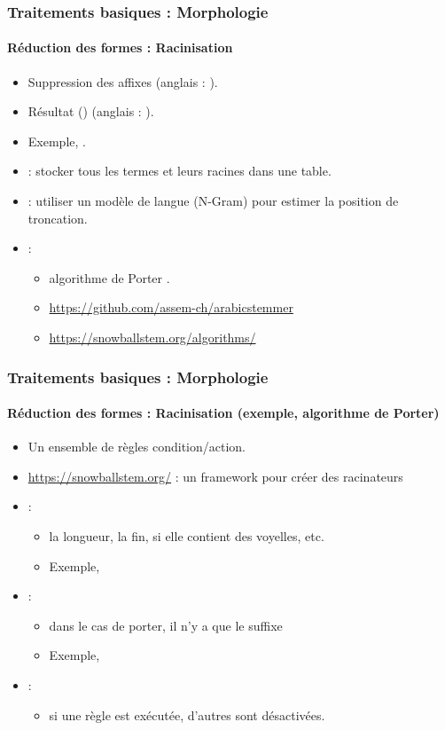 \documentclass[xcolor=table]{beamer}
\begin{document}
\begin{frame}
\frametitle{Traitements basiques : Morphologie}
\framesubtitle{Réduction des formes : Racinisation}

\begin{itemize}
	\item Suppression des affixes (anglais : ).
	\item Résultat  () (anglais : ).
	\item Exemple, .
	\item {} : stocker tous les termes et leurs racines dans une table.
	\item {} : utiliser un modèle de langue (N-Gram) pour estimer la position de troncation.
	\item {} :
	\begin{itemize}
		\item algorithme de Porter \cite{1980-porter}.
		\item \url{https://github.com/assem-ch/arabicstemmer}
		\item \url{https://snowballstem.org/algorithms/}
	\end{itemize}
\end{itemize}

\end{frame}

\begin{frame}
\frametitle{Traitements basiques : Morphologie}
\framesubtitle{Réduction des formes : Racinisation (exemple, algorithme de Porter)}

\begin{itemize}
	\item Un ensemble de règles condition/action.
	\item \url{https://snowballstem.org/} : un framework pour créer des racinateurs
	\item {} :
	\begin{itemize}
		\item la longueur, la fin, si elle contient des voyelles, etc.
		\item Exemple, 
	\end{itemize}
	\item {} :
	\begin{itemize}
		\item dans le cas de porter, il n'y a que le suffixe 
		\item Exemple, 
	\end{itemize}
	\item {} :
	\begin{itemize}
		\item si une règle est exécutée, d'autres sont désactivées.
	\end{itemize}
\end{itemize}

\end{frame}
\end{document}
